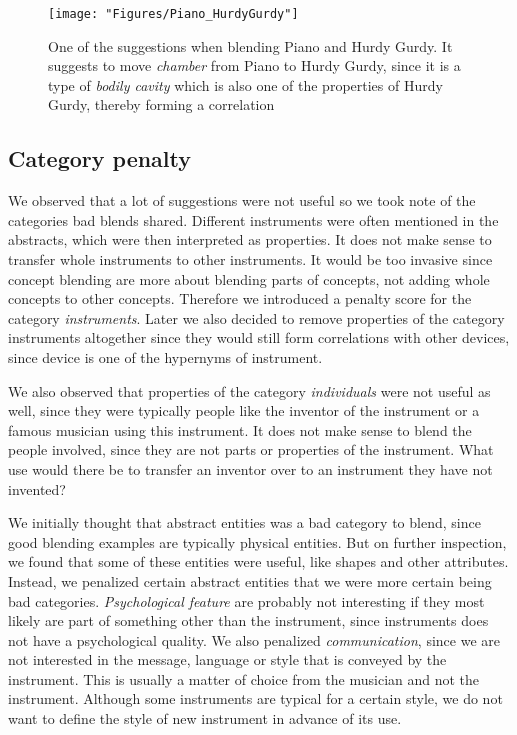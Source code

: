 \begin{figure}
	\centering
	\texttt{[image: "Figures/Piano\_HurdyGurdy"]}
	\caption{One of the suggestions when blending Piano and Hurdy Gurdy. It suggests to move \emph{chamber} from Piano to Hurdy Gurdy, since it is a type of \emph{bodily cavity} which is also one of the properties of Hurdy Gurdy, thereby forming a correlation }
	\label{fig:piano-hurdy-gurdy}
\end{figure}

\subsection{Category penalty}
We observed that a lot of suggestions were not useful so we took note of the categories bad blends shared. Different instruments were often mentioned in the abstracts, which were then interpreted as properties. It does not make sense to transfer whole instruments to other instruments. It would be too invasive since concept blending are more about blending parts of concepts, not adding whole concepts to other concepts. Therefore we introduced a penalty score for the category \emph{instruments}. Later we also decided to remove properties of the category instruments altogether since they would still form correlations with other devices, since device is one of the hypernyms of instrument.

We also observed that properties of the category \emph{individuals} were not useful as well, since they were typically people like the inventor of the instrument or a famous musician using this instrument. It does not make sense to blend the people involved, since they are not parts or properties of the instrument. What use would there be to transfer an inventor over to an instrument they have not invented?

We initially thought that abstract entities was a bad category to blend, since good blending examples are typically physical entities. But on further inspection, we found that some of these entities were useful, like shapes and other attributes. Instead, we penalized certain abstract entities that we were more certain being bad categories. \emph{Psychological feature} are probably not interesting if they most likely are part of something other than the instrument, since instruments does not have a psychological quality. We also penalized \emph{communication}, since we are not interested in the message, language or style that is conveyed by the instrument. This is usually a matter of choice from the musician and not the instrument. Although some instruments are typical for a certain style, we do not want to define the style of new instrument in advance of its use.

